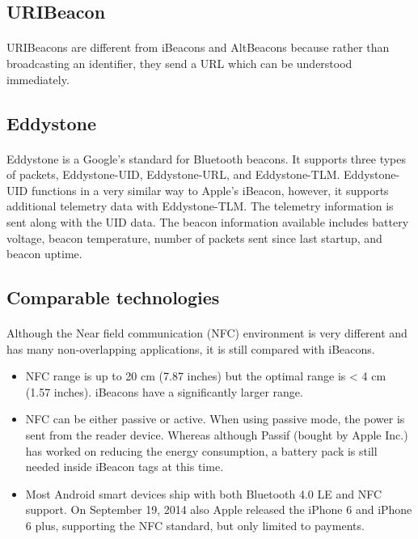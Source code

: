 \documentclass[a4paper,12pt]{report}
\begin{document}
\subsection{URIBeacon}
\paragraph{}URIBeacons are different from iBeacons and AltBeacons because rather than broadcasting an identifier, they send a URL which can be understood immediately.
\subsection{Eddystone}
\paragraph{}Eddystone is a Google's standard for Bluetooth beacons. It supports three types of packets, Eddystone-UID, Eddystone-URL, and Eddystone-TLM. Eddystone-UID functions in a very similar way to Apple's iBeacon, however, it supports additional telemetry data with Eddystone-TLM. The telemetry information is sent along with the UID data. The beacon information available includes battery voltage, beacon temperature, number of packets sent since last startup, and beacon uptime.
\subsection{Comparable technologies}
\paragraph{}Although the Near field communication (NFC) environment is very different and has many non-overlapping applications, it is still compared with iBeacons.
\begin{itemize}
	\item NFC range is up to 20 cm (7.87 inches) but the optimal range is < 4 cm (1.57 inches). iBeacons have a significantly larger range.
	\item NFC can be either passive or active. When using passive mode, the power is sent from the reader device. Whereas although Passif (bought by Apple Inc.) has worked on reducing the energy consumption, a battery pack is still needed inside iBeacon tags at this time.
	\item Most Android smart devices ship with both Bluetooth 4.0 LE and NFC support. On September 19, 2014 also Apple released the iPhone 6 and iPhone 6 plus, supporting the NFC standard, but only limited to payments.
\end{itemize}
\end{document}
